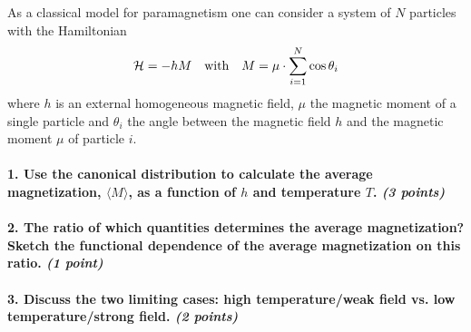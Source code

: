 As a classical model for paramagnetism one 
can consider a system of $N$ particles with 
the Hamiltonian
\begin{equation}
    \mathcal{H}=-hM
    \ \ \ \textnormal{with}\ \ \ 
    M=\mu\cdot\sum_{i=1}^N\cos\theta_i
\end{equation}
where $h$ is an external homogeneous magnetic 
field, $\mu$ the magnetic moment of a single 
particle and $\theta_i$ the angle between the
magnetic field $h$ and the magnetic moment
$\mu$ of particle $i$.

\paragraph{1. Use the canonical distribution 
    to calculate the average magnetization, 
    $\langle M\rangle$, as a function of $h$
    and temperature $T$. 
    \textit{(3 points)}
}

\paragraph{2. The ratio of which quantities 
    determines the average magnetization? 
    Sketch the functional dependence of the 
    average magnetization on this ratio. 
    \textit{(1 point)}
}

\paragraph{3. Discuss the two limiting cases: 
    high temperature/weak field vs. 
    low temperature/strong field.
    \textit{(2 points)}
}

